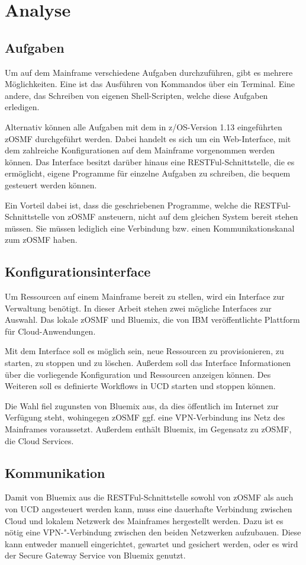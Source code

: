 \section{Analyse}

\subsection{Aufgaben}
Um auf dem Mainframe verschiedene Aufgaben durchzuführen, gibt es mehrere Möglichkeiten. Eine ist das Ausführen von Kommandos
über ein Terminal. Eine andere, das Schreiben von eigenen Shell-Scripten, welche diese Aufgaben erledigen.

Alternativ können alle Aufgaben mit dem in z/OS-Version 1.13 eingeführten zOSMF durchgeführt werden. Dabei handelt es
sich um ein Web-Interface, mit dem zahlreiche Konfigurationen auf dem Mainframe vorgenommen werden können. Das Interface
besitzt darüber hinaus eine RESTFul-Schnittstelle, die es ermöglicht, eigene Programme für einzelne Aufgaben zu schreiben,
die bequem gesteuert werden können.

Ein Vorteil dabei ist, dass die geschriebenen Programme, welche die RESTFul-Schnit\-tstelle von zOSMF ansteuern, nicht auf
dem gleichen System bereit stehen müssen. Sie müssen lediglich eine Verbindung bzw. einen Kommunikationskanal zum zOSMF
haben.

\subsection{Konfigurationsinterface}
Um Ressourcen auf einem Mainframe bereit zu stellen, wird ein Interface zur Verwaltung benötigt. In dieser Arbeit stehen
zwei mögliche Interfaces zur Auswahl. Das lokale zOSMF und Bluemix, die von IBM
veröffentlichte Plattform für Cloud-Anwendungen.

Mit dem Interface soll es möglich sein, neue Ressourcen zu provisionieren, zu starten, zu stoppen und zu löschen. Außerdem
soll das Interface Informationen über die vorliegende Konfiguration und Ressourcen anzeigen können. Des Weiteren soll es
definierte Workflows in UCD starten und stoppen können.

Die Wahl fiel zugunsten von Bluemix aus, da dies öffentlich im Internet zur Verfügung steht, wohingegen zOSMF ggf. eine
VPN-Verbindung ins Netz des Mainframes voraussetzt. Außerdem enthält Bluemix, im Gegensatz zu zOSMF, die Cloud Services.

\subsection{Kommunikation}
Damit von Bluemix aus die RESTFul-Schnittstelle sowohl von zOSMF als auch von UCD angesteuert werden kann, muss eine
dauerhafte Verbindung zwischen Cloud und lokalem Netzwerk des Mainframes hergestellt werden. Dazu ist es nötig eine
VPN-"-Verbindung zwischen den beiden Netzwerken aufzubauen. Diese kann entweder manuell eingerichtet, gewartet und
gesichert werden, oder es wird der Secure Gateway Service von Bluemix genutzt.


